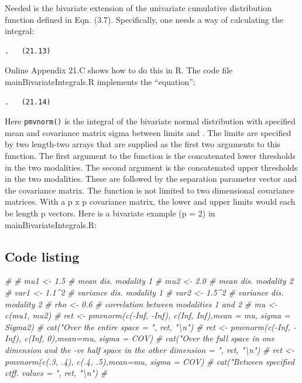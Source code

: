 \documentclass[
]{book}
\newenvironment{Shaded}{\begin{snugshade}}{\end{snugshade}}
\newcommand{\CommentTok}[1]{\textcolor[rgb]{0.56,0.35,0.01}{\textit{#1}}}
\begin{document}
Needed is the bivariate extension of the univariate cumulative distribution function defined in Eqn. (3.7). Specifically, one needs a way of calculating the integral:

\begin{verbatim}
.   (21.13)
\end{verbatim}

Online Appendix 21.C shows how to do this in R. The code file mainBivariateIntegrals.R implements the ``equation'':

\begin{verbatim}
.   (21.14)
\end{verbatim}

Here \texttt{pmvnorm()} is the integral of the bivariate normal distribution with specified mean and covariance matrix sigma between limits and . The limits are specified by two length-two arrays that are supplied as the first two arguments to this function. The first argument to the function is the concatenated lower thresholds in the two modalities. The second argument is the concatenated upper thresholds in the two modalities. These are followed by the separation parameter vector and the covariance matrix. The function is not limited to two dimensional covariance matrices. With a p x p covariance matrix, the lower and upper limits would each be length p vectors. Here is a bivariate example (p = 2) in mainBivariateIntegrals.R:

\hypertarget{bivariate-binormal-model-multivariate-density-estimation-code}{%
\subsection{Code listing}\label{bivariate-binormal-model-multivariate-density-estimation-code}}

\begin{Shaded}
\begin{Highlighting}[]
\CommentTok{\# }
\CommentTok{\# mu1 \textless{}{-} 1.5 \# mean dis. modality 1}
\CommentTok{\# mu2 \textless{}{-} 2.0 \# mean dis. modality 2}
\CommentTok{\# var1 \textless{}{-} 1.1\^{}2  \# variance dis. modality 1}
\CommentTok{\# var2 \textless{}{-} 1.5\^{}2 \# variance dis. modality 2}
\CommentTok{\# rho \textless{}{-} 0.6 \# correlation between modalities 1 and 2}
\CommentTok{\# mu \textless{}{-} c(mu1, mu2)}
\CommentTok{\# ret \textless{}{-} pmvnorm(c({-}Inf, {-}Inf), c(Inf, Inf),mean = mu, sigma = Sigma2)}
\CommentTok{\# cat("Over the entire space = ", ret, "\textbackslash{}n")}
\CommentTok{\# ret \textless{}{-} pmvnorm(c({-}Inf, {-}Inf), c(Inf, 0),mean=mu, sigma = COV)}
\CommentTok{\# cat("Over the full space in one dimension and the {-}ve half space in the other dimension = ", ret, "\textbackslash{}n")}
\CommentTok{\# ret \textless{}{-} pmvnorm(c(.3, .4), c(.4, .5),mean=mu, sigma = COV)}
\CommentTok{\# cat("Between specified ctff. values = ", ret, "\textbackslash{}n")}
\CommentTok{\# }
\end{Highlighting}
\end{Shaded}
\end{document}
